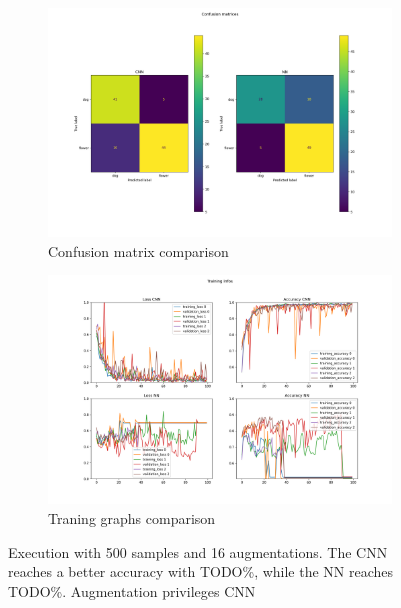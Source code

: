 \documentclass{report}
\begin{document}
\begin{figure}[t!]
  \centering
  \hspace{-2cm}
  \begin{subfigure}[t]{0.49\textwidth}
    \centering
    \includegraphics[width=1.3\textwidth]{10.500_aug16/conf_mat.png}
    \caption{Confusion matrix comparison}
    \label{fig:image-set5-sub1}
  \end{subfigure}
  \hspace{-0.5cm}
  \begin{subfigure}[t]{0.49\textwidth}
    \centering
    \includegraphics[width=1.3\textwidth]{10.500_aug16/training_infos.png}
    \caption{Traning graphs comparison}
    \label{fig:image-set5-sub2}
  \end{subfigure}

  \caption{Execution with 500 samples and 16 augmentations. The CNN reaches a better accuracy with TODO\%, while the NN reaches TODO\%. Augmentation privileges CNN}
  \label{fig:image-set5}
\end{figure}
\end{document}

